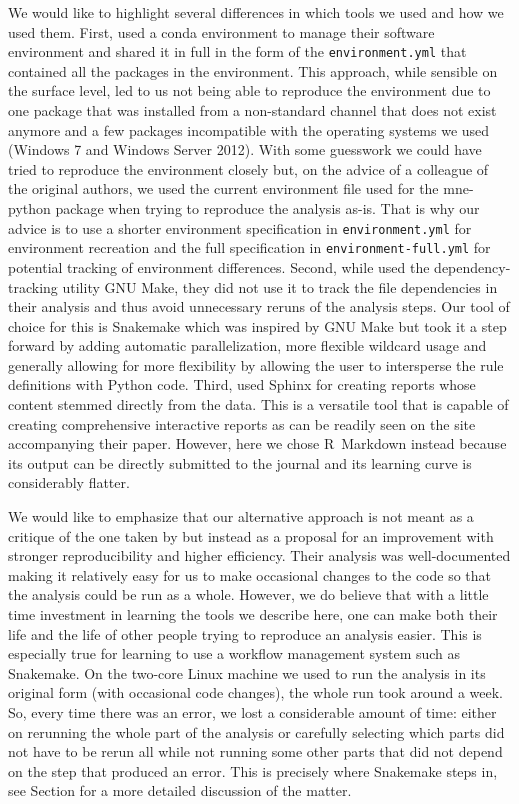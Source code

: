\documentclass[a4paper,man,floatsintext,natbib]{apa6}
\begin{document}
We would like to highlight several differences in which tools we used and how we used them. First, \cite{jasReproducibleMEGEEG2018a} used a conda environment to manage their software environment and shared it in full in the form of the \verb|environment.yml| that contained all the packages in the environment. This approach, while sensible on the surface level, led to us not being able to reproduce the environment due to one package that was installed from a non-standard channel that does not exist anymore and a few packages incompatible with the operating systems we used (Windows 7 and Windows Server 2012). With some guesswork we could have tried to reproduce the environment closely but, on the advice of a colleague of the original authors, we used the current environment file used for the mne-python package when trying to reproduce the analysis as-is. That is why our advice is to use a shorter environment specification in \verb|environment.yml| for environment recreation and the full specification in \verb|environment-full.yml| for potential tracking of environment differences. Second, while \cite{jasReproducibleMEGEEG2018a} used the dependency-tracking utility GNU Make, they did not use it to track the file dependencies in their analysis and thus avoid unnecessary reruns of the analysis steps. Our tool of choice for this is Snakemake which was inspired by GNU Make but took it a step forward by adding automatic parallelization, more flexible wildcard usage and generally allowing for more flexibility by allowing the user to intersperse the rule definitions with Python code. Third, \cite{jasReproducibleMEGEEG2018a} used Sphinx for creating reports whose content stemmed directly from the data. This is a versatile tool that is capable of creating comprehensive interactive reports as can be readily seen on the site accompanying their paper. However, here we chose R~Markdown instead because its output can be directly submitted to the journal and its learning curve is considerably flatter.

We would like to emphasize that our alternative approach is not meant as a critique of the one taken by \cite{jasReproducibleMEGEEG2018a} but instead as a proposal for an improvement with stronger reproducibility and higher efficiency. Their analysis was well-documented making it relatively easy for us to make occasional changes to the code so that the analysis could be run as a whole. However, we do believe that with a little time investment in learning the tools we describe here, one can make both their life and the life of other people trying to reproduce an analysis easier. This is especially true for learning to use a workflow management system such as Snakemake. On the two-core Linux machine we used to run the \cite{jasReproducibleMEGEEG2018a} analysis in its original form (with occasional code changes), the whole run took around a week. So, every time there was an error, we lost a considerable amount of time: either on rerunning the whole part of the analysis or carefully selecting which parts did not have to be rerun all while not running some other parts that did not depend on the step that produced an error. This is precisely where Snakemake steps in, see Section  for a more detailed discussion of the matter.
\end{document}
